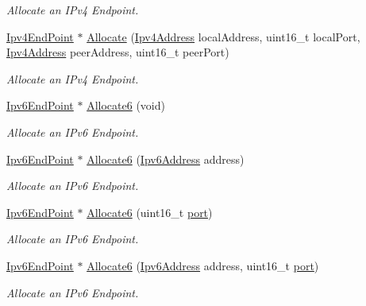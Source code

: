 \begin{DoxyCompactItemize}
\begin{DoxyCompactList}\small\item\em Allocate an I\+Pv4 Endpoint. \end{DoxyCompactList}\item 
\hyperlink{classns3_1_1Ipv4EndPoint}{Ipv4\+End\+Point} $\ast$ \hyperlink{classns3_1_1UdpL4Protocol_abb3e02919564597b4d5f160e4d987b5b}{Allocate} (\hyperlink{classns3_1_1Ipv4Address}{Ipv4\+Address} local\+Address, uint16\+\_\+t local\+Port, \hyperlink{classns3_1_1Ipv4Address}{Ipv4\+Address} peer\+Address, uint16\+\_\+t peer\+Port)
\begin{DoxyCompactList}\small\item\em Allocate an I\+Pv4 Endpoint. \end{DoxyCompactList}\item 
\hyperlink{classns3_1_1Ipv6EndPoint}{Ipv6\+End\+Point} $\ast$ \hyperlink{classns3_1_1UdpL4Protocol_ac24dba915979036a3ece31a6f7678cb8}{Allocate6} (void)
\begin{DoxyCompactList}\small\item\em Allocate an I\+Pv6 Endpoint. \end{DoxyCompactList}\item 
\hyperlink{classns3_1_1Ipv6EndPoint}{Ipv6\+End\+Point} $\ast$ \hyperlink{classns3_1_1UdpL4Protocol_ad051daf1e2fe949b2d713d42b36007bd}{Allocate6} (\hyperlink{classns3_1_1Ipv6Address}{Ipv6\+Address} address)
\begin{DoxyCompactList}\small\item\em Allocate an I\+Pv6 Endpoint. \end{DoxyCompactList}\item 
\hyperlink{classns3_1_1Ipv6EndPoint}{Ipv6\+End\+Point} $\ast$ \hyperlink{classns3_1_1UdpL4Protocol_a4086e77c7dd0db4346d9eebbec67227c}{Allocate6} (uint16\+\_\+t \hyperlink{visualizer-ideas_8txt_a21ff1c530daf8435e00048b7fc2c58e3}{port})
\begin{DoxyCompactList}\small\item\em Allocate an I\+Pv6 Endpoint. \end{DoxyCompactList}\item 
\hyperlink{classns3_1_1Ipv6EndPoint}{Ipv6\+End\+Point} $\ast$ \hyperlink{classns3_1_1UdpL4Protocol_ace726d253bee809f4cc876902220f8a9}{Allocate6} (\hyperlink{classns3_1_1Ipv6Address}{Ipv6\+Address} address, uint16\+\_\+t \hyperlink{visualizer-ideas_8txt_a21ff1c530daf8435e00048b7fc2c58e3}{port})
\begin{DoxyCompactList}\small\item\em Allocate an I\+Pv6 Endpoint. \end{DoxyCompactList}\item 

\end{DoxyCompactItemize}
